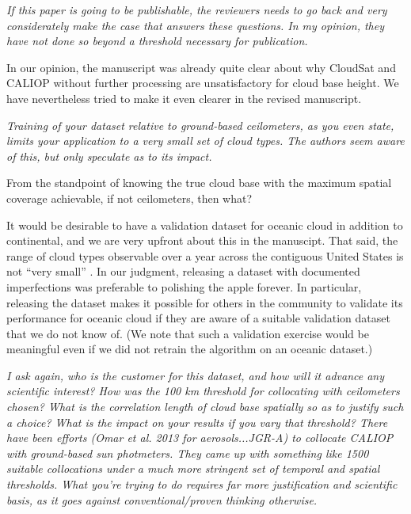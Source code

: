\documentclass[12pt,a4paper]{responses}
\newcommand{\commentjm}[1]{\todo[inline, color=red!50]{$j_\mu$: #1}}
\begin{document}
\textit{If this paper is going to be publishable, the reviewers needs
to go back and very considerately make the case that answers these questions. In my
opinion, they have not done so beyond a threshold necessary for publication.}

In our opinion, the manuscript was already quite clear about why CloudSat and
CALIOP without further processing are unsatisfactory for cloud base height.  We
have nevertheless tried to make it even clearer in the revised manuscript.

\textit{Training of your dataset relative to ground-based ceilometers, as you
  even state, limits your application to a very small set of cloud types. The
  authors seem aware of this, but only speculate as to its impact.}

From the standpoint of knowing the true cloud base with the maximum spatial
coverage achievable, if not ceilometers, then what?  

It would be desirable to have a validation dataset for oceanic cloud in addition
to continental, and we are very upfront about this in the manuscipt.  That said,
the range of cloud types observable over a year across the contiguous United
States is not ``very small'' \commentjm{if anyone has a good citation here, that
  would be great}.  In our judgment, releasing a dataset with documented
imperfections was preferable to polishing the apple forever.  In particular,
releasing the dataset makes it possible for others in the community to validate
its performance for oceanic cloud if they are aware of a suitable validation
dataset that we do not know of.  (We note that such a validation exercise would
be meaningful even if we did not retrain the algorithm on an oceanic dataset.)

\textit{I ask again, who is the customer for this dataset, and how will it
  advance any scientific interest? How was the 100 km threshold for collocating
with ceilometers chosen?  What is the correlation length of cloud base spatially so as
to justify such a choice? What is the impact on your results if you vary that threshold?
There have been efforts (Omar et al. 2013 for aerosols...JGR-A) to collocate CALIOP
with ground-based sun photmeters.  They came up with something like 1500 suitable
collocations under a much more stringent set of temporal and spatial thresholds. What
you’re trying to do requires far more justification and scientific basis, as it goes against
conventional/proven thinking otherwise.}
\end{document}
